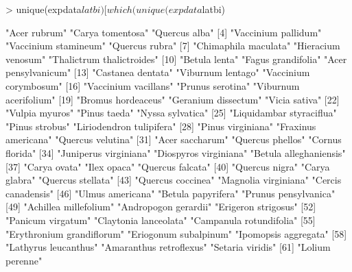 \documentclass{article}
\begin{document}
\begin{Schunk}
\begin{Sinput}
> unique(expdata$latbi)[which(unique(expdata$latbi) %
\end{Sinput}
\begin{Soutput}
 [1] "Acer rubrum"              "Carya tomentosa"          "Quercus alba"            
 [4] "Vaccinium pallidum"       "Vaccinium stamineum"      "Quercus rubra"           
 [7] "Chimaphila maculata"      "Hieracium venosum"        "Thalictrum thalictroides"
[10] "Betula lenta"             "Fagus grandifolia"        "Acer pensylvanicum"      
[13] "Castanea dentata"         "Viburnum lentago"         "Vaccinium corymbosum"    
[16] "Vaccinium vacillans"      "Prunus serotina"          "Viburnum acerifolium"    
[19] "Bromus hordeaceus"        "Geranium dissectum"       "Vicia sativa"            
[22] "Vulpia myuros"            "Pinus taeda"              "Nyssa sylvatica"         
[25] "Liquidambar styraciflua"  "Pinus strobus"            "Liriodendron tulipifera" 
[28] "Pinus virginiana"         "Fraxinus americana"       "Quercus velutina"        
[31] "Acer saccharum"           "Quercus phellos"          "Cornus florida"          
[34] "Juniperus virginiana"     "Diospyros virginiana"     "Betula alleghaniensis"   
[37] "Carya ovata"              "Ilex opaca"               "Quercus falcata"         
[40] "Quercus nigra"            "Carya glabra"             "Quercus stellata"        
[43] "Quercus coccinea"         "Magnolia virginiana"      "Cercis canadensis"       
[46] "Ulmus americana"          "Betula papyrifera"        "Prunus pensylvanica"     
[49] "Achillea millefolium"     "Andropogon gerardii"      "Erigeron strigosus"      
[52] "Panicum virgatum"         "Claytonia lanceolata"     "Campanula rotundifolia"  
[55] "Erythronium grandiflorum" "Eriogonum subalpinum"     "Ipomopsis aggregata"     
[58] "Lathyrus leucanthus"      "Amaranthus retroflexus"   "Setaria viridis"         
[61] "Lolium perenne"          
\end{Soutput}
\end{Schunk}
\end{document}
